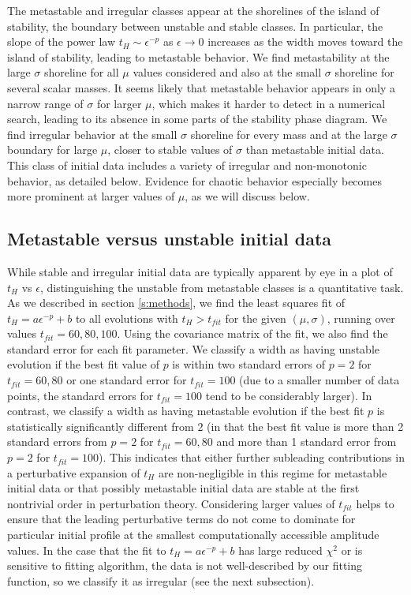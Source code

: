 \documentclass[../PhD.tex]{subfiles}
\begin{document}
The metastable and irregular classes appear at the shorelines of the island
of stability, the boundary between unstable and stable classes.  In particular,
the slope of the power law $t_H\sim \epsilon^{-p}$ as $\epsilon\to 0$
increases as the width moves toward the island of stability, leading to 
metastable behavior.  We find metastability at the large $\sigma$ shoreline
for all $\mu$ values considered and also at the small $\sigma$ shoreline
for several scalar masses.  It seems likely that metastable behavior appears
in only a narrow range of $\sigma$ for larger $\mu$, which makes it harder
to detect in a numerical search, leading to its absence in some parts of the
stability phase diagram.  We find irregular behavior 
at the small $\sigma$ shoreline
for every mass and at the large $\sigma$ boundary for large $\mu$,
closer to stable values of $\sigma$ than metastable initial data.  This class
of initial data
includes a variety of irregular and non-monotonic behavior, as detailed below.
Evidence for chaotic behavior especially becomes more prominent at larger 
values of $\mu$, as we will discuss below.

\subsection{Metastable versus unstable initial data}\label{s:metastable}

While stable and irregular initial data are typically apparent by eye in a plot
of $t_H$ vs $\epsilon$, distinguishing the unstable from metastable classes
is a quantitative task.  As we described in section \ref{s:methods}, we
find the least squares fit of $t_H=a\epsilon^{-p}+b$ to all evolutions
with $t_H>t_{fit}$ for the given $(\mu,\sigma)$, running over values
$t_{fit}=60,80,100$.  Using the covariance matrix of the fit, we also find
the standard error for each fit parameter.  We classify a width as having
unstable evolution if the best fit value of $p$ is within two standard
errors of $p=2$ for $t_{fit}=60,80$ or one standard error for $t_{fit}=100$
(due to a smaller number of data points, the standard errors for $t_{fit}=100$
tend to be considerably larger).  In contrast, we classify a width
as having metastable evolution if the best fit $p$ is statistically
significantly different from $2$ (in that the best fit value is more than 2
standard errors from $p=2$ for $t_{fit}=60,80$ and more than 1 standard error
from $p=2$ for $t_{fit}=100$). This indicates that either further subleading
contributions in a perturbative expansion of $t_H$ are non-negligible in
this regime for metastable initial data or that possibly metastable initial
data are stable at the first nontrivial order in perturbation theory.
Considering larger values of $t_{fit}$
helps to ensure that the leading perturbative terms do not come to 
dominate for particular initial profile at the smallest computationally
accessible amplitude values.  In the case that the fit
to $t_H=a\epsilon^{-p}+b$ has large reduced $\chi^2$ or is sensitive to
fitting algorithm, the data is not well-described by our fitting function,
so we classify it as irregular (see the next subsection).
\end{document}
